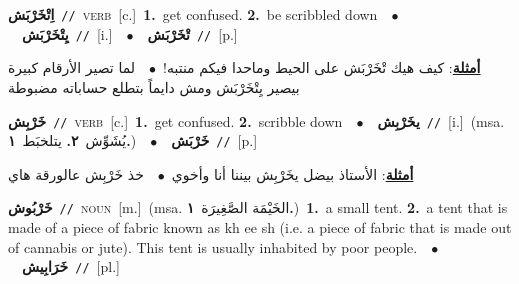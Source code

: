 \documentclass[10pt,a4paper,twoside]{article} %
\begin{document}
\begin{multicols}{2}
{{{{{{{{{{{\setlength\topsep{0pt}\textbf{\foreignlanguage{arabic}{اِتْخَرْبَش}}\ {\color{gray}\texttt{//}\color{black}}\ \textsc{verb}\ [c.]\ \textbf{1.}~get confused.  \textbf{2.}~be scribbled down\ \ $\bullet$\ \ \setlength\topsep{0pt}\textbf{\foreignlanguage{arabic}{يِتْخَرْبَش}}\ {\color{gray}\texttt{//}\color{black}}\ [i.]\ \ $\bullet$\ \ \setlength\topsep{0pt}\textbf{\foreignlanguage{arabic}{تْخَرْبَش}}\ {\color{gray}\texttt{//}\color{black}}\ [p.]\  \begin{flushright}\color{gray}\foreignlanguage{arabic}{\textbf{\underline{\foreignlanguage{arabic}{أمثلة}}}: كيف هيك تْخَرْبَش على الحيط وماحدا فيكم منتبه!\ $\bullet$\ \  لما تصير الأرقام كبيرة بيصير يِتْخَرْبَش ومش دايماً بتطلع حساباته مضبوطة}\end{flushright}\color{black}} \vspace{2mm}

{\setlength\topsep{0pt}\textbf{\foreignlanguage{arabic}{خَرْبِش}}\ {\color{gray}\texttt{//}\color{black}}\ \textsc{verb}\ [c.]\ \textbf{1.}~get confused.  \textbf{2.}~scribble down\ \ $\bullet$\ \ \setlength\topsep{0pt}\textbf{\foreignlanguage{arabic}{يخَرْبِش}}\ {\color{gray}\texttt{//}\color{black}}\ [i.]\ \color{gray}(msa. \foreignlanguage{arabic}{يُشَوِّش}~\foreignlanguage{arabic}{\textbf{٢.}}  \foreignlanguage{arabic}{يتلخبَط}~\foreignlanguage{arabic}{\textbf{١.}})\color{black}\ \ $\bullet$\ \ \setlength\topsep{0pt}\textbf{\foreignlanguage{arabic}{خَرْبَش}}\ {\color{gray}\texttt{//}\color{black}}\ [p.]\  \begin{flushright}\color{gray}\foreignlanguage{arabic}{\textbf{\underline{\foreignlanguage{arabic}{أمثلة}}}: الأستاذ بيضل يخَرْبِش بيننا أنا وأخوي\ $\bullet$\ \  خذ خَرْبِش عالورقة هاي}\end{flushright}\color{black}} \vspace{2mm}

{\setlength\topsep{0pt}\textbf{\foreignlanguage{arabic}{خَرْبُوش}}\ {\color{gray}\texttt{//}\color{black}}\ \textsc{noun}\ [m.]\ \color{gray}(msa. \foreignlanguage{arabic}{الخَيْمَة الصَّغِيرَة}~\foreignlanguage{arabic}{\textbf{١.}})\color{black}\ \textbf{1.}~a small tent.  \textbf{2.}~a tent that is made of a piece of fabric known as kh ee sh (i.e. a piece of fabric that is made out of cannabis or jute). This tent is usually inhabited by poor people.\ \ $\bullet$\ \ \setlength\topsep{0pt}\textbf{\foreignlanguage{arabic}{خَرَابِيش}}\ {\color{gray}\texttt{//}\color{black}}\ [pl.]\ 

}}}}}}}}}}}
\end{multicols}
\end{document}
